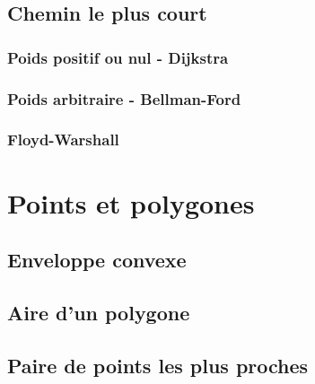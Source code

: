\documentclass[8pt]{article}
\begin{document}
        \subsection{Chemin le plus court}
            \subsubsection{Poids positif ou nul - Dijkstra}
            \subsubsection{Poids arbitraire - Bellman-Ford}
            \subsubsection{Floyd-Warshall}
    \section{Points et polygones}
        \subsection{Enveloppe convexe}
        \subsection{Aire d'un polygone}
        \subsection{Paire de points les plus proches}
\end{document}
